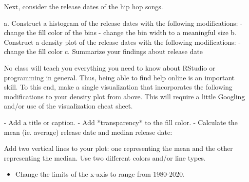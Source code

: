 \documentclass[
  letterpaper,
  DIV=11,
  numbers=noendperiod]{scrreprt}
\newenvironment{Shaded}{\begin{snugshade}}{\end{snugshade}}
\newcommand{\FunctionTok}[1]{\textcolor[rgb]{0.28,0.35,0.67}{#1}}
\newcommand{\NormalTok}[1]{\textcolor[rgb]{0.00,0.23,0.31}{#1}}
\newcommand{\SpecialCharTok}[1]{\textcolor[rgb]{0.37,0.37,0.37}{#1}}
\providecommand{\tightlist}{%
  \setlength{\itemsep}{0pt}\setlength{\parskip}{0pt}}\usepackage{longtable,booktabs,array}
\begin{document}
\begin{Shaded}
\begin{Highlighting}[]
\NormalTok{Next, consider the release dates of the hip hop songs.    }
  
\NormalTok{  a. Construct a histogram of the release dates with the following modifications:    }
\NormalTok{    {-} change the fill color of the bins    }
\NormalTok{    {-} change the bin width to a meaningful size    }
\NormalTok{  b. Construct a density plot of the release dates with the following modifications:    }
\NormalTok{    {-} change the fill color    }
\NormalTok{  c. Summarize your findings about release date}
\end{Highlighting}
\end{Shaded}

\begin{Shaded}
\begin{Highlighting}[]
\NormalTok{No class will teach you everything you need to know about RStudio or programming in general. Thus, being able to find help online is an important skill.  To this end, make a single visualization that incorporates the following modifications to your density plot from above.  This will require a little Googling and/or use of the visualization cheat sheet.    }

\NormalTok{  {-} Add a title or caption.    }
\NormalTok{  {-} Add *transparency* to the fill color.    }
\NormalTok{  {-} Calculate the mean (ie. average) release date and median release date:}
\end{Highlighting}
\end{Shaded}

\begin{Shaded}
\end{Shaded}

Add two vertical lines to your plot: one representing the mean and the
other representing the median. Use two different colors and/or line
types.

\begin{itemize}
\tightlist
\item
  Change the limits of the x-axis to range from 1980-2020.
\end{itemize}
\end{document}
